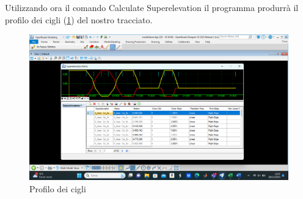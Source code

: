 Utilizzando ora il comando Calculate Superelevation il programma produrrà il profilo dei cigli (\ref{Profilo dei cigli}) del nostro tracciato.

\begin{figure}[H]
    \includegraphics[width=\textwidth]{Figures/Profilo dei cigli.png}
      \caption{Profilo dei cigli}
      \label{Profilo dei cigli}
\end{figure}


